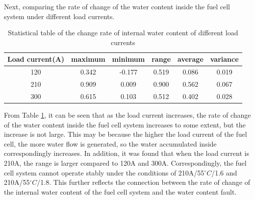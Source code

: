 Next, comparing the rate of change of the water content inside the fuel cell system under different load currents.

\begin{table}
	\centering
	\begin{center}
		\caption{Statistical table of the change rate of internal water content of different load currents}
		\label{tab:StatisticalTable}
		\begin{tabular}{cccccc}
			\toprule
			\textbf{Load current(A)} & \textbf{maximum} & \textbf{minimum} & \textbf{range} & \textbf{average} & \textbf{variance} \\
			\midrule
			120                      & 0.342            & -0.177           & 0.519          & 0.086            & 0.019             \\
			210                      & 0.909            & 0.009            & 0.900          & 0.562            & 0.067             \\
			300                      & 0.615            & 0.103            & 0.512          & 0.402            & 0.028             \\
			\bottomrule
		\end{tabular}
	\end{center}
\end{table}
From Table \ref{tab:StatisticalTable}, it can be seen that as the load current increases, the rate of change of the water content inside the fuel cell system increases to some extent, but the increase is not large. This may be because the higher the load current of the fuel cell, the more water flow is generated, so the water accumulated inside correspondingly increases. In addition, it was found that when the load current is 210A, the range is larger compared to 120A and 300A. Correspondingly, the fuel cell system cannot operate stably under the conditions of 210A/55$^{\circ}C$/1.6 and 210A/55$^{\circ}C$/1.8. This further reflects the connection between the rate of change of the internal water content of the fuel cell system and the water content fault.
